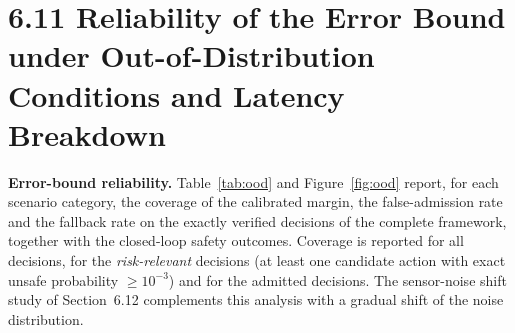 \documentclass[11pt]{article}
\begin{document}
\clearpage
\section*{6.11 \quad Reliability of the Error Bound under Out-of-Distribution Conditions and Latency Breakdown}
\textbf{Error-bound reliability.} Table~\ref{tab:ood} and Figure~\ref{fig:ood} report, for each scenario category, the coverage of the calibrated
margin, the false-admission rate and the fallback rate on the exactly verified decisions of the complete framework, together with the
closed-loop safety outcomes. Coverage is reported for all decisions, for the \emph{risk-relevant} decisions (at least one candidate action with
exact unsafe probability $\ge 10^{-3}$) and for the admitted decisions. The sensor-noise shift study of Section~6.12 complements this analysis
with a gradual shift of the noise distribution.
\end{document}
